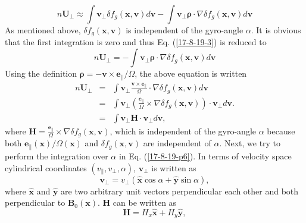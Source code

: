 \documentclass{article}
\newcommand{\tmmathbf}[1]{\ensuremath{\boldsymbol{#1}}}
\begin{document}
\begin{equation}
  \label{17-8-19-3} n\mathbf{U}_{\perp} \approx \int \mathbf{v}_{\perp} \delta
  f_g (\mathbf{x}, \mathbf{v}) d\mathbf{v}- \int \mathbf{v}_{\perp}
  \tmmathbf{\rho} \cdot \nabla \delta f_g (\mathbf{x}, \mathbf{v}) d\mathbf{v}
\end{equation}
As mentioned above, $\delta f_g (\mathbf{x}, \mathbf{v})$ is independent of
the gyro-angle $\alpha$. It is obvious that the first integration is zero and
thus Eq. (\ref{17-8-19-3}) is reduced to
\begin{equation}
  n\mathbf{U}_{\perp} = - \int \mathbf{v}_{\perp} \tmmathbf{\rho} \cdot \nabla
  \delta f_g (\mathbf{x}, \mathbf{v}) d\mathbf{v}
\end{equation}
Using the definition $\tmmathbf{\rho}= -\mathbf{v} \times
\mathbf{e}_{\parallel} / \Omega$, the above equation is written
\begin{eqnarray}
  n\mathbf{U}_{\perp} & = & \int \mathbf{v}_{\perp} \frac{\mathbf{v} \times
  \mathbf{e}_{\parallel}}{\Omega} \cdot \nabla \delta f_g (\mathbf{x},
  \mathbf{v}) d\mathbf{v} \nonumber\\
  & = & \int \mathbf{v}_{\perp} \left( \frac{\mathbf{e}_{\parallel}}{\Omega}
  \times \nabla \delta f_g (\mathbf{x}, \mathbf{v}) \right) \cdot
  \mathbf{v}_{\perp} d\mathbf{v}. \nonumber\\
  & = & \int \mathbf{v}_{\perp} \mathbf{H} \cdot \mathbf{v}_{\perp}
  d\mathbf{v},  \label{17-8-19-p6}
\end{eqnarray}
where $\mathbf{H}= \frac{\mathbf{e}_{\parallel}}{\Omega} \times \nabla \delta
f_g (\mathbf{x}, \mathbf{v})$, which is independent of the gyro-angle $\alpha$
because both $\mathbf{e}_{\parallel} (\mathbf{x}) / \Omega (\mathbf{x})$ and
$\delta f_g (\mathbf{x}, \mathbf{v})$ are independent of $\alpha$. Next, we
try to perform the integration over $\alpha$ in Eq. (\ref{17-8-19-p6}). In
terms of velocity space cylindrical coordinates $(v_{\parallel}, v_{\perp},
\alpha)$, $\mathbf{v}_{\perp}$ is written as
\begin{equation}
  \mathbf{v}_{\perp} = v_{\perp} (\hat{\mathbf{x}} \cos \alpha +
  \hat{\mathbf{y}} \sin \alpha),
\end{equation}
where $\hat{\mathbf{x}}$ and $\hat{\mathbf{y}}$ are two arbitrary unit vectors
perpendicular each other and both perpendicular to $\mathbf{B}_0
(\mathbf{x})$. $\mathbf{H}$ can be written as
\begin{equation}
  \mathbf{H}= H_x \hat{\mathbf{x}} + H_y \hat{\mathbf{y}},
\end{equation}
\end{document}

